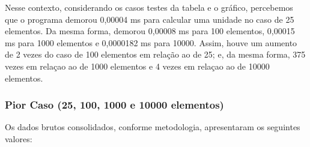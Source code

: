 \documentclass[a4paper, 12pt]{article}
\begin{document}
\vspace{0.8cm}
Nesse contexto, considerando os casos testes da tabela e o gráfico, percebemos que o programa demorou 0,00004 ms para calcular uma unidade no caso de 25 elementos. Da mesma forma, demorou 0,00008 ms para 100 elementos, 0,00015 ms para 1000 elementos e 0,0000182 ms para 10000. Assim, houve um aumento de 2 vezes do caso de 100 elementos em relação ao de 25; e, da mesma forma, 375 vezes em relaçao ao de 1000 elementos e 4 vezes em relaçao ao de 10000 elementos.


\subsubsection{Pior Caso (25, 100, 1000 e 10000 elementos)}

\tab{ }Os dados brutos consolidados, conforme metodologia, apresentaram os seguintes valores:
\vspace{0.2cm}
\end{document}
